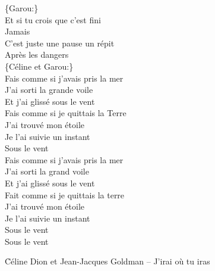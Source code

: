 \documentclass{novel}
\begin{document}
\begin{multicols}{2}
\{Garou:\} \\
Et si tu crois que c'est fini \\
Jamais \\
C'est juste une pause un répit \\
Après les dangers \\

\{Céline et Garou:\} \\
Fais comme si j'avais pris la mer \\
J'ai sorti la grande voile \\
Et j'ai glissé sous le vent \\
Fais comme si je quittais la Terre \\
J'ai trouvé mon étoile \\
Je l'ai suivie un instant \\
Sous le vent \\

Fais comme si j'avais pris la mer \\
J'ai sorti la grand voile \\
Et j'ai glissé sous le vent \\
Fait comme si je quittais la terre \\
J'ai trouvé mon étoile \\
Je l'ai suivie un instant \\
Sous le vent \\
Sous le vent
\end{multicols}


\newpage
\normalsize
\h*{Céline Dion et Jean-Jacques Goldman – J’irai où tu iras}
\end{document}
